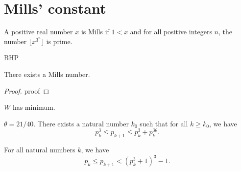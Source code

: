 %

\chapter{Mills' constant}

\begin{definition}
    \label{def:mills}
    A positive real number $x$ is Mills if $1 < x$ and
    for all positive integers $n$, the number $\lfloor x^{3^n} \rfloor$ is prime.
\end{definition}

\begin{theorem}
    \label{thm:BHP}
    BHP
\end{theorem}

\begin{proposition}
    \label{prop:mills}
    There exists a Mills number.
\end{proposition}

\begin{proof}
    proof
\end{proof}

\begin{proposition}
    \label{prop:proposition4}
    $W$ has minimum.
\end{proposition}

\begin{proposition}
    \label{prop:proposition5}
    $\theta = 21/40$.
    There exists a natural number $k_0$ such that for all $k \geq k_0$, we have
    $$
    p_k^3 \leq p_{k+1} \leq p_k^3 + p_k^{3\theta}.
    $$
\end{proposition}

\begin{lemma}
    \label{lem:lemma6}
    For all natural numbers $k$, we have
    $$
    p_k \leq p_{k+1} < (p_k^3 + 1)^3 - 1.
    $$
\end{lemma}


